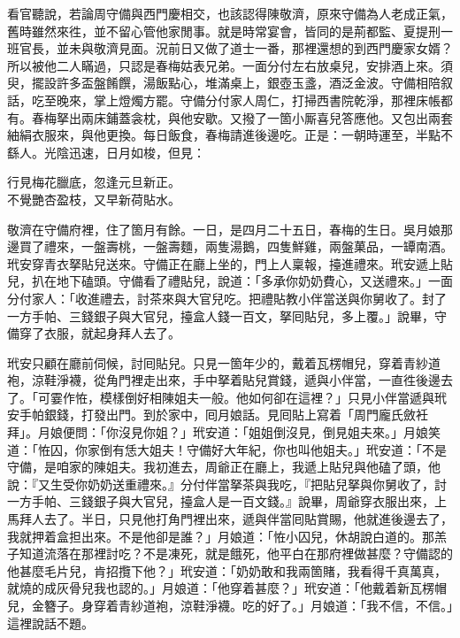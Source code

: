 看官聽說，若論周守備與西門慶相交，也該認得陳敬濟，原來守備為人老成正氣，舊時雖然來徃，並不留心管他家閒事。就是時常宴會，皆同的是荊都監、夏提刑一班官長，並未與敬濟見面。況前日又做了道士一番，那裡還想的到西門慶家女婿？所以被他二人瞞過，只認是春梅姑表兄弟。一面分付左右放桌兒，安排酒上來。須臾，擺設許多盃盤餚饌，湯飯點心，堆滿桌上，銀壺玉盞，酒泛金波。守備相陪叙話，吃至晚來，掌上燈燭方罷。守備分付家人周仁，打掃西書院乾淨，那裡床帳都有。春梅拏出兩床鋪蓋衾枕，與他安歇。又撥了一箇小厮喜兒答應他。又包出兩套紬絹衣服來，與他更換。每日飯食，春梅請進後邊吃。正是：一朝時運至，半點不繇人。光陰迅速，日月如梭，但見：

\begin{myquote}
行見梅花臘底，忽逢元旦新正。\\不覺艷杏盈枝，又早新荷貼水。
\end{myquote}

敬濟在守備府裡，住了箇月有餘。一日，是四月二十五日，春梅的生日。吳月娘那邊買了禮來，一盤壽桃，一盤壽麵，兩隻湯鵝，四隻鮮雞，兩盤菓品，一罈南酒。玳安穿青衣拏貼兒送來。守備正在廳上坐的，門上人稟報，擡進禮來。玳安遞上貼兒，扒在地下磕頭。守備看了禮貼兒，說道：「多承你奶奶費心，又送禮來。」一面分付家人：「收進禮去，討茶來與大官兒吃。把禮貼教小伴當送與你舅收了。封了一方手帕、三錢銀子與大官兒，擡盒人錢一百文，拏囘貼兒，多上覆。」說畢，守備穿了衣服，就起身拜人去了。

玳安只顧在廳前伺候，討囘貼兒。只見一箇年少的，戴着瓦楞帽兒，穿着青紗道袍，涼鞋淨襪，從角門裡走出來，手中拏着貼兒賞錢，遞與小伴當，一直徃後邊去了。「可霎作恠，模樣倒好相陳姐夫一般。他如何卻在這裡？」只見小伴當遞與玳安手帕銀錢，打發出門。到於家中，囘月娘話。見囘貼上寫着「周門龐氏斂衽拜」。月娘便問：「你沒見你姐？」玳安道：「姐姐倒沒見，倒見姐夫來。」月娘笑道：「恠囚，你家倒有恁大姐夫！守備好大年紀，你也叫他姐夫。」玳安道：「不是守備，是咱家的陳姐夫。我初進去，周爺正在廳上，我遞上貼兒與他磕了頭，他說：『又生受你奶奶送重禮來。』分付伴當拏茶與我吃，『把貼兒拏與你舅收了，討一方手帕、三錢銀子與大官兒，擡盒人是一百文錢。』說畢，周爺穿衣服出來，上馬拜人去了。半日，只見他打角門裡出來，遞與伴當囘貼賞賜，他就進後邊去了，我就押着盒担出來。不是他卻是誰？」月娘道：「恠小囚兒，休胡說白道的。那羔子知道流落在那裡討吃？不是凍死，就是餓死，他平白在那府裡做甚麼？守備認的他甚麼毛片兒，肯招攬下他？」玳安道：「奶奶敢和我兩箇賭，我看得千真萬真，就燒的成灰骨兒我也認的。」月娘道：「他穿着甚麼？」玳安道：「他戴着新瓦楞帽兒，金簪子。身穿着青紗道袍，涼鞋淨襪。吃的好了。」月娘道：「我不信，不信。」{}這裡說話不題。

